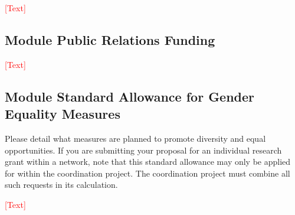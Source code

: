 \documentclass[a4paper,11pt]{article}
\begin{document}
\noindent\textcolor{red}{[Text]}

\subsection{Module Public Relations Funding}

\noindent\textcolor{red}{[Text]}

\subsection{Module Standard Allowance for Gender Equality Measures}
Please detail what measures are planned to promote diversity and equal opportunities.
If you are submitting your proposal for an individual research grant within a network, note that this standard allowance may only be applied for within the coordination project. The coordination project must combine all such requests in its calculation.

\noindent\textcolor{red}{[Text]}
\end{document}
